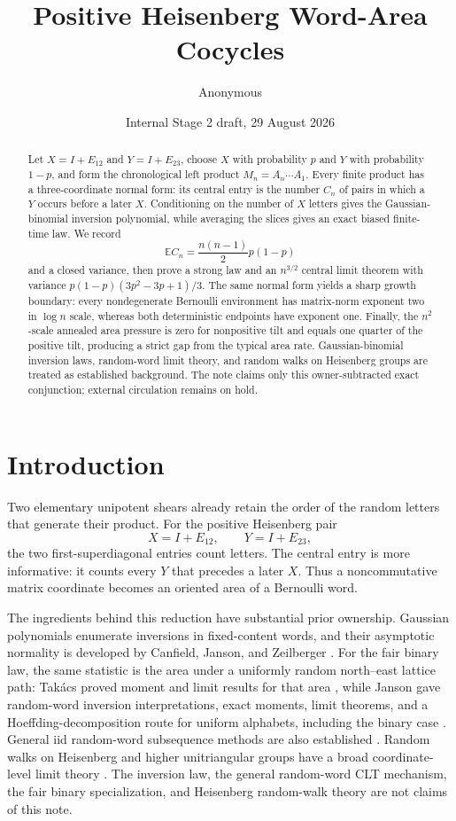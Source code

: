 \documentclass[11pt,a4paper]{amsart}
\title{Positive Heisenberg Word-Area Cocycles}
\author{Anonymous}
\date{Internal Stage 2 draft, 29 August 2026}
\theoremstyle{definition}
\theoremstyle{remark}
\newcommand{\Exp}{\mathbb E}
\begin{document}
\begin{abstract}
Let $X=I+E_{12}$ and $Y=I+E_{23}$, choose $X$ with probability $p$ and
$Y$ with probability $1-p$, and form the chronological left product
$M_n=A_n\cdots A_1$.  Every finite product has a three-coordinate normal
form: its central entry is the number $C_n$ of pairs in which a $Y$ occurs
before a later $X$.  Conditioning on the number of $X$ letters gives the
Gaussian-binomial inversion polynomial, while averaging the slices gives
an exact biased finite-time law.  We record
\[
 \Exp C_n=\frac{n(n-1)}2p(1-p)
\]
and a closed variance, then prove a strong law and an $n^{3/2}$ central
limit theorem with variance
$p(1-p)(3p^2-3p+1)/3$.  The same normal form yields a sharp growth
boundary: every nondegenerate Bernoulli environment has matrix-norm
exponent two in $\log n$ scale, whereas both deterministic endpoints have
exponent one.  Finally, the $n^2$-scale annealed area pressure is zero for
nonpositive tilt and equals one quarter of the positive tilt, producing a
strict gap from the typical area rate.  Gaussian-binomial inversion laws,
random-word limit theory, and random walks on Heisenberg groups are treated
as established background.  The note claims only this owner-subtracted
exact conjunction; external circulation remains on hold.
\end{abstract}

\maketitle

\section{Introduction}

Two elementary unipotent shears already retain the order of the random
letters that generate their product.  For the positive Heisenberg pair
\[
 X=I+E_{12},\qquad Y=I+E_{23},
\]
the two first-superdiagonal entries count letters.  The central entry is
more informative: it counts every $Y$ that precedes a later $X$.  Thus a
noncommutative matrix coordinate becomes an oriented area of a Bernoulli
word.

The ingredients behind this reduction have substantial prior ownership.
Gaussian polynomials enumerate inversions in fixed-content words, and their
asymptotic normality is developed by Canfield, Janson, and Zeilberger
\cite{CanfieldJansonZeilberger2011,CanfieldJansonZeilberger2012}.
For the fair binary law, the same statistic is the area under a uniformly
random north--east lattice path: Tak\'acs proved moment and limit results for
that area \cite{Takacs1986}, while Janson gave random-word inversion
interpretations, exact moments, limit theorems, and a Hoeffding-decomposition
route for uniform alphabets, including the binary case
\cite{Janson2012}.  General iid random-word subsequence methods are also
established \cite{IslakOzdemir2018}.  Random walks on
Heisenberg and higher unitriangular groups have a broad coordinate-level
limit theory \cite{DiaconisHough2021}.  The inversion law, the general
random-word CLT mechanism, the fair binary specialization, and Heisenberg
random-walk theory are not claims of this note.
\end{document}
